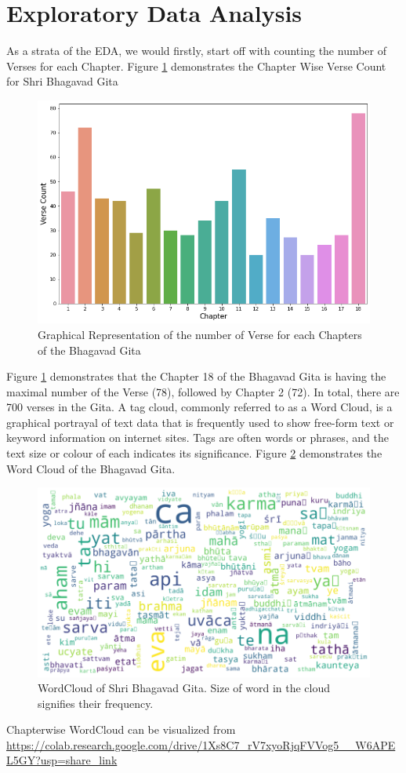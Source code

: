 \documentclass[runningheads]{llncs}
\begin{document}
\section{Exploratory Data Analysis}
As a strata of the EDA, we would firstly, start off with counting the number of Verses for each Chapter. Figure \ref{fig1} demonstrates the Chapter Wise Verse Count for Shri Bhagavad Gita
\begin{figure}
\centering
\includegraphics[width=\textwidth]{1}
\caption{Graphical Representation of the number of Verse for each Chapters of the Bhagavad Gita}
\label{fig1}
\end{figure} 
Figure \ref{fig1} demonstrates that the Chapter 18 of the Bhagavad Gita is having the maximal number of the Verse (78), followed by Chapter 2 (72). In total, there are 700 verses in the Gita. A tag cloud, commonly referred to as a Word Cloud, is a graphical portrayal of text data that is frequently used to show free-form text or keyword information on internet sites. Tags are often words or phrases, and the text size or colour of each indicates its significance. Figure \ref{fig2} demonstrates the Word Cloud of the Bhagavad Gita.
\begin{figure}
\centering
\includegraphics[width=\textwidth]{2}
\caption{WordCloud of Shri Bhagavad Gita. Size of word in the cloud signifies their frequency. }
\label{fig2}
\end{figure} 
Chapterwise WordCloud can be visualized from \href{https://colab.research.google.com/drive/1Xs8C7_rV7xyoRjqFVVog5__W6APEL5GY?usp=share_link}{https://colab.research.google.com/drive/1Xs8C7_rV7xyoRjqFVVog5__W6APEL5GY?usp=share_link}
\end{document}
